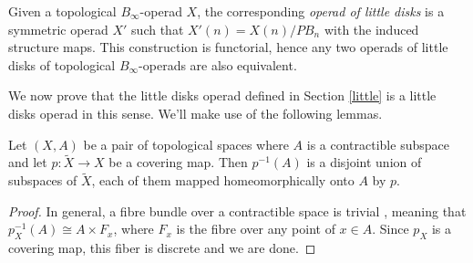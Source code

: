 \documentclass[TFM.tex]{subfiles}
\begin{document}
Given a topological $B_\infty$-operad $X$, the corresponding \emph{operad of little disks} is a symmetric operad $X'$ such that $X'(n)=X(n)/PB_n$ with the induced structure maps. This construction is functorial, hence any two operads of little disks of topological $B_\infty$-operads are also equivalent. %



We now prove that the little disks operad defined in Section \ref{little} is a little disks operad in this sense. We'll make use of the following lemmas.

\begin{lemma}\label{contractible}
Let $(X,A)$ be a pair of topological spaces where $A$ is a contractible subspace  and let $p:\widetilde{X}\to X$ be a covering map. Then $p^{-1}(A)$ is a disjoint union of subspaces of $\widetilde{X}$, each of them mapped homeomorphically onto $A$ by $p$. 
\end{lemma}
\begin{proof}
In general, a fibre bundle over a contractible space is trivial \cite[Proposition 3.5]{bundle}, meaning that $p_X^{-1}(A)\cong A\times F_{x}$, where $F_x$ is the fibre over any point of $x\in A$. Since $p_X$ is a covering map, this fiber is discrete and we are done. 
\end{proof}
\end{document}
